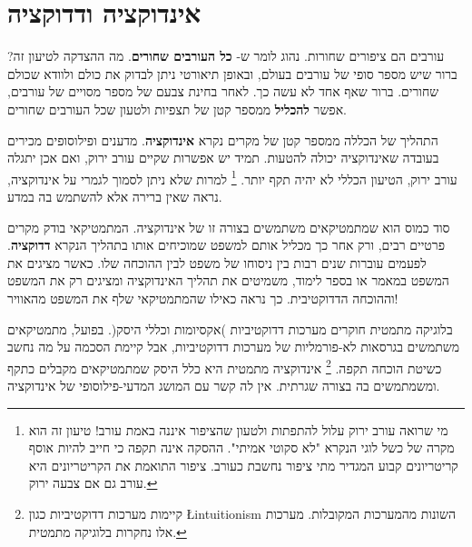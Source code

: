 
\chapter{%
אינדוקציה ודדוקציה%
}\label{s.ind-ded}

עורבים הם ציפורים שחורות. נהוג לומר ש-%
\textbf{כל העורבים שחורים}.
מה ההצדקה לטיעון זה? ברור שיש מספר סופי של עורבים בעולם, ובאופן תיאורטי ניתן לבדוק את כולם ולוודא שכולם שחורים. ברור שאף אחד לא עשה כך. לאחר בחינת צבעם של מספר מסויים של עורבים, אפשר
\textbf{להכליל}
ממספר קטן של תצפיות ולטעון שכל העורבים שחורים.

התהליך של הכללה ממספר קטן של מקרים נקרא
\textbf{אינדוקציה}.
מדענים ופילוסופים מכירים בעובדה שאינדוקציה יכולה להטעות. תמיד יש אפשרות שקיים עורב ירוק, ואם אכן יתגלה עורב ירוק, הטיעון הכללי לא יהיה תקף יותר.%
\footnote{%
מי שרואה עורב ירוק עלול להתפתות ולטעון שהציפור איננה באמת עורב! טיעון זה הוא מקרה של כשל לוגי הנקרא "לא סקוטי אמיתי". ההסקה אינה תקפה כי חייב להיות אוסף קריטריונים קבוע המגדיר מתי ציפור נחשבת כעורב. ציפור התואמת את הקריטריונים היא עורב גם אם צבעה ירוק.%
}
למרות שלא ניתן לסמוך לגמרי על אינדוקציה, נראה שאין ברירה אלא להשתמש בה במדע.

סוד כמוס הוא שמתמטיקאים משתמשים בצורה זו של אינדוקציה. המתמטיקאי בודק מקרים פרטיים רבים, ורק אחר כך מכליל אותם למשפט שמוכיחים אותו בתהליך הנקרא
\textbf{דדוקציה}.
לפעמים עוברות שנים רבות בין ניסוחו של משפט לבין ההוכחה שלו. כאשר מציגים את המשפט במאמר או בספר לימוד, משמיטים את תהליך האינדוקציה ומציגים רק את המשפט וההוכחה הדדוקטיבית. כך נראה כאילו שהמתמטיקאי שלף את המשפט מהאוויר!

בלוגיקה מתמטית חוקרים מערכות דדוקטיביות )אקסיומות וכללי היסק(. בפועל, מתמטיקאים משתמשים בגרסאות לא-פורמליות של מערכות דדוקטיביות, אבל קיימת הסכמה על מה נחשב כשיטת הוכחה תקפה.%
\footnote{%
קיימות מערכות דדוקטיביות כגון
\L{intuitionism}
השונות מהמערכות המקובלות. מערכות אלו נחקרות בלוגיקה מתמטית.%
}
אינדוקציה מתמטית היא כלל היסק שמתמטיקאים מקבלים כתקף ומשמתמשים בה בצורה שגרתית. אין לה קשר עם המושג המדעי-פילוסופי של אינדוקציה.

